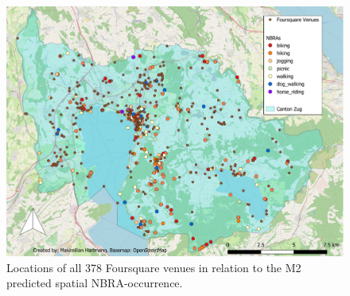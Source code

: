 \begin{figure}[h!]
   \centering
   \includegraphics[width=\textwidth,height=\textheight,keepaspectratio]{img/foursquare_compare_cropped.pdf}
   \caption{Locations of all 378 Foursquare venues in relation to the M2 predicted spatial NBRA-occurrence.}
   \label{fig:map_foursquare_comparison}
\end{figure}


